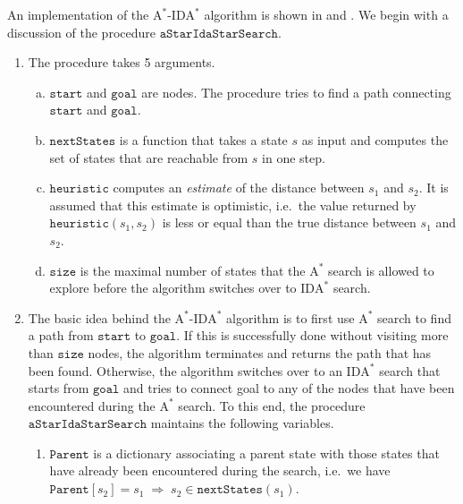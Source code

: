 An implementation of the $\mathrm{A}^*$-$\mathrm{IDA}^*$ algorithm is shown in 
and .  We begin with a discussion of the procedure $\texttt{aStarIdaStarSearch}$.
\begin{enumerate}
\item The procedure takes 5 arguments.
      \begin{enumerate}[(a)]
      \item $\texttt{start}$ and $\texttt{goal}$ are nodes.  The procedure tries to find a path connecting
            $\texttt{start}$ and $\texttt{goal}$.
      \item $\texttt{nextStates}$ is a function that takes a state $s$ as input and computes the set of states that are
            reachable from $s$ in one step.
      \item $\texttt{heuristic}$ computes an \emph{estimate} of the distance between $s_1$ and $s_2$.  It is
            assumed that this estimate is optimistic, i.e.~the value returned by $\texttt{heuristic}(s_1, s_2)$
            is less or equal than the true distance between $s_1$ and $s_2$.
      \item $\texttt{size}$ is the maximal number of states that the $\mathrm{A}^*$ search is allowed to
            explore before the algorithm switches over to $\mathrm{IDA}^*$ search.
      \end{enumerate}
\item The basic idea behind the $\mathrm{A}^*$-$\mathrm{IDA}^*$ algorithm is to first use $\mathrm{A}^*$ search
      to find a path from $\texttt{start}$ to $\texttt{goal}$.  If this is successfully done without visiting
      more than $\texttt{size}$ nodes, the algorithm terminates and returns the path that has been found.
      Otherwise, the algorithm switches over to an $\mathrm{IDA}^*$ search that starts from $\texttt{goal}$ and
      tries to connect goal to any of the nodes that have been encountered during the $\mathrm{A}^*$ search.
      To this end, the procedure $\texttt{aStarIdaStarSearch}$ maintains the following variables.
      \begin{enumerate}
      \item $\texttt{Parent}$ is a dictionary associating a parent state with those states that have already been
            encountered during the search, i.e.~we have
            \\[0.2cm]
            \hspace*{1.3cm}
            $\texttt{Parent}[s_2] = s_1 \;\Rightarrow\; s_2 \in \texttt{nextStates}(s_1)$.

\end{enumerate}
\end{enumerate}
